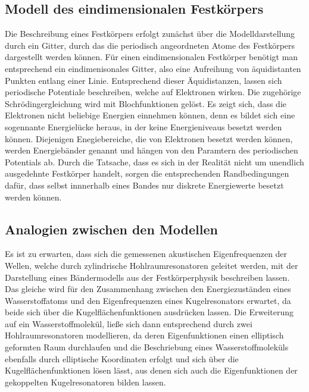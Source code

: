 \subsection{Modell des eindimensionalen Festkörpers}
Die Beschreibung eines Festkörpers erfolgt zunächst über die Modelldarstellung durch ein 
Gitter, durch das die periodisch angeordneten Atome des Festkörpers dargestellt werden können.
Für einen eindimensionalen Festkörper benötigt man entsprechend ein eindimenisonales Gitter,
also eine Aufreihung von äquidistanten Punkten entlang einer Linie.
Entsprechend dieser Äquidistanzen, lassen sich periodische Potentiale beschreiben, 
welche auf Elektronen wirken. Die zugehörige Schrödingergleichung wird mit 
Blochfunktionen gelöst. Es zeigt sich, dass die Elektronen nicht beliebige Energien 
einnehmen können, denn es bildet sich eine sogennante Energielücke heraus, in der 
keine Energieniveaus besetzt werden können.
Diejenigen Enegiebereiche, die von Elektronen besetzt werden können, werden Energiebänder 
genannt und hängen von den Paramtern des periodischen Potentials ab. Durch die 
Tatsache, dass es sich in der Realität nicht um unendlich ausgedehnte Festkörper handelt, 
sorgen die entsprechenden Randbedingungen dafür, dass selbst innnerhalb eines Bandes 
nur diskrete Energiewerte besetzt werden können.

\newpage
\subsection{Analogien zwischen den Modellen}
Es ist zu erwarten, dass sich die gemessenen akustischen Eigenfrequenzen der Wellen,
welche durch zylindrische Hohlraumresonatoren geleitet werden, mit der Darstellung eines
Bändermodells aus der Festkörperphysik beschreiben lassen.
Das gleiche wird für den Zusammenhang zwischen den Energiezuständen eines 
Wasserstoffatoms und den Eigenfrequenzen eines Kugelresonators erwartet, 
da beide sich über die 
Kugelflächenfunktionen ausdrücken lassen.
Die Erweiterung auf ein Wasserstoffmolekül, ließe sich dann entsprechend durch 
zwei Hohlraumresonatoren modellieren, da deren Eigenfunktionen einen elliptisch 
geformten Raum durchlaufen und die Beschriebung eines Wasserstoffmoleküls ebenfalls 
durch elliptische Koordinaten erfolgt und sich über die Kugelflächenfunktionen
lösen lässt, aus denen sich auch die Eigenfunktionen der gekoppelten Kugelresonatoren 
bilden lassen. 

\cite{sample}
\cite{dem1}
\cite{dem3}
\newpage